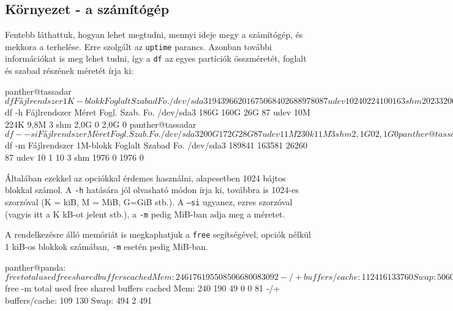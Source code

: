 \subsection{Környezet - a számítógép}

Fentebb láthattuk, hogyan lehet megtudni, mennyi ideje megy a számítógép, és
mekkora a terhelése. Erre szolgált az \texttt{uptime} parancs. Azonban további
információkat is meg lehet tudni, így a \texttt{df} az egyes partíciók
összméretét, foglalt és szabad részének méretét írja ki:

\begin{VerbExample}
panther@tassadar ~ $ df
Fájlrendszer          1K-blokk   Foglalt    Szabad Fo.%
/dev/sda3            194396620 167506840  26889780  87%
udev                     10240       224     10016   3%
shm                    2023320         0   2023320   0%
panther@tassadar ~ $ df  -h
Fájlrendszer         Méret  Fogl. Szab. Fo.%
/dev/sda3             186G  160G   26G  87%
udev                   10M  224K  9,8M   3%
shm                   2,0G     0  2,0G   0%
panther@tassadar ~ $ df  --si
Fájlrendszer          Méret  Fogl.  Szab.  Fo.%
/dev/sda3              200G   172G    28G  87%
udev                    11M   230k    11M   3%
shm                    2,1G      0   2,1G   0%
panther@tassadar ~ $ df  -m
Fájlrendszer          1M-blokk   Foglalt    Szabad Fo.%
/dev/sda3               189841    163581     26260  87%
udev                        10         1        10   3%
shm                       1976         0      1976   0%
\end{VerbExample}

Általában ezekkel az opciókkal érdemes használni, alapesetben 1024 bájtos
blokkal számol. A \texttt{-h} hatására jól olvasható módon írja ki, továbbra is
1024-es szorzóval (K = kiB, M = MiB, G=GiB stb.). A \texttt{--si} ugyanez, ezres
szorzóval (vagyis itt a K kB-ot jelent stb.), a \texttt{-m} pedig MiB-ban adja
meg a méretet.

A rendelkezésre álló memóriát is megkaphatjuk a \texttt{free} segítségével,
opciók nélkül 1 kiB-os blokkok számában, \texttt{-m} esetén pedig MiB-ban.

\begin{VerbExample}
panther@panda:~$ free
             total       used       free     shared    buffers     cached
Mem:        246176     195508      50668          0          0      83092
-/+ buffers/cache:     112416     133760
Swap:       506008       3016     502992
panther@panda:~$ free -m
             total       used       free     shared    buffers     cached
Mem:           240        190         49          0          0         81
-/+ buffers/cache:        109        130
Swap:          494          2        491
\end{VerbExample}

